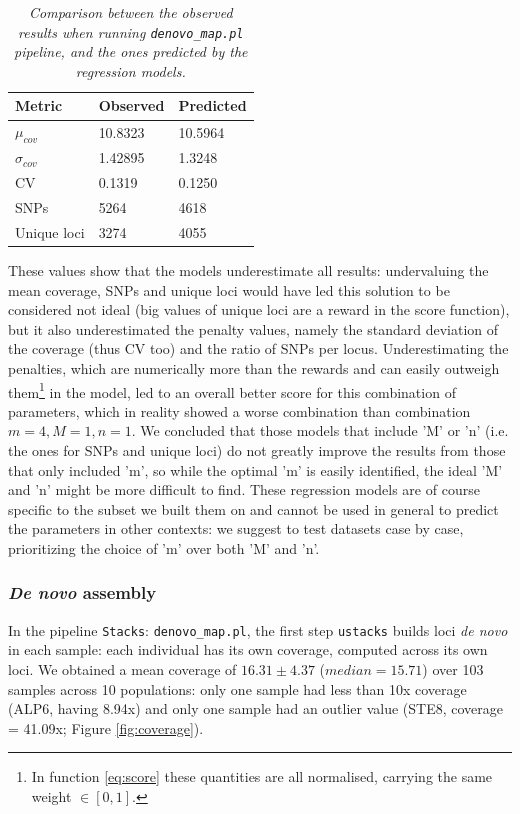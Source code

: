 \documentclass[a4paper, 12pt]{report}
\begin{document}
\begin{table}[ht]
	\centering
	\caption{\textbf{Observed and Predicted metrics for combination $m = 4$, $M = 0$ and $n = 4$.}}
	\label{tab:pred_vs_obs}
	\begin{tabularx}{\textwidth}{XXX}
		\hline
		\textbf{Metric} & \textbf{Observed} & \textbf{Predicted} \\
		\hline
		$\mu_{cov}$    & 10.8323 & 10.5964 \\
		$\sigma_{cov}$ & 1.42895 & 1.3248  \\
		CV             & 0.1319  & 0.1250  \\
		SNPs           & 5264    & 4618    \\
		Unique loci    & 3274    & 4055    \\
		\hline
	\end{tabularx}
	\caption*{\footnotesize{\textit{Comparison between the observed results when running \texttt{denovo\_map.pl} pipeline, and the ones predicted by the regression models.}}}
\end{table}
\vspace{-1em}
These values show that the models underestimate all results: undervaluing the mean coverage, SNPs and unique loci would have led this solution to be considered not ideal (big values of unique loci are a reward in the score function), but it also underestimated the penalty values, namely the standard deviation of the coverage (thus CV too) and the ratio of SNPs per locus. Underestimating the penalties, which are numerically more than the rewards and can easily outweigh them\footnote{In function \ref{eq:score} these quantities are all normalised, carrying the same weight $\in [0,1]$.} in the model, led to an overall better score for this combination of parameters, which in reality showed a worse combination than combination $m = 4, M = 1, n = 1$. We concluded that those models that include 'M' or 'n' (i.e. the ones for SNPs and unique loci) do not greatly improve the results from those that only included 'm', so while the optimal 'm' is easily identified, the ideal 'M' and 'n' might be more difficult to find. These regression models are of course specific to the subset we built them on and cannot be used in general to predict the parameters in other contexts: we suggest to test datasets case by case, prioritizing the choice of 'm' over both 'M' and 'n'.

\subsubsection{\textit{De novo} assembly}
\vspace{-1em}
In the pipeline \texttt{Stacks}: \texttt{denovo\_map.pl}, the first step \texttt{ustacks} builds loci \textit{de novo} in each sample: each individual has its own coverage, computed across its own loci. We obtained a mean coverage of $16.31 \pm 4.37$ ($median = 15.71$) over 103 samples across 10 populations: only one sample had less than 10x coverage (ALP6, having 8.94x) and only one sample had an outlier value (STE8, coverage = 41.09x; Figure \ref{fig:coverage}).
\end{document}
